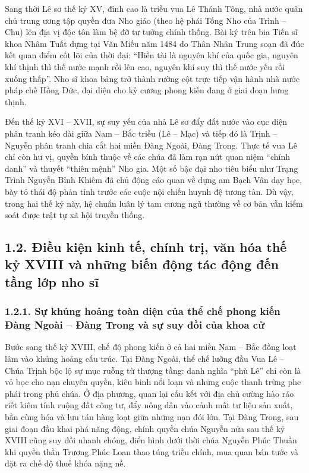 Sang thời Lê sơ thế kỷ XV, đỉnh cao là triều vua Lê Thánh Tông, nhà nước quân chủ trung ương tập quyền đưa Nho giáo (theo hệ phái Tống Nho của Trình -- Chu) lên địa vị độc tôn làm bệ đỡ tư tưởng chính thống. Bài ký trên bia Tiến sĩ khoa Nhâm Tuất dựng tại Văn Miếu năm 1484 do Thân Nhân Trung soạn đã đúc kết quan điểm cốt lõi của thời đại: ``Hiền tài là nguyên khí của quốc gia, nguyên khí thịnh thì thế nước mạnh rồi lên cao, nguyên khí suy thì thế nước yếu rồi xuống thấp''. Nho sĩ khoa bảng trở thành rường cột trực tiếp vận hành nhà nước pháp chế Hồng Đức, đại diện cho kỷ cương phong kiến đang ở giai đoạn hưng thịnh.

Đến thế kỷ XVI -- XVII, sự suy yếu của nhà Lê sơ đẩy đất nước vào cục diện phân tranh kéo dài giữa Nam -- Bắc triều (Lê -- Mạc) và tiếp đó là Trịnh -- Nguyễn phân tranh chia cắt hai miền Đàng Ngoài, Đàng Trong. Thực tế vua Lê chỉ còn hư vị, quyền bính thuộc về các chúa đã làm rạn nứt quan niệm ``chính danh'' và thuyết ``thiên mệnh'' Nho gia. Một số bậc đại nho tiêu biểu như Trạng Trình Nguyễn Bỉnh Khiêm đã chủ động cáo quan về dựng am Bạch Vân dạy học, bày tỏ thái độ phản tỉnh trước các cuộc nội chiến huynh đệ tương tàn. Dù vậy, trong hai thế kỷ này, hệ chuẩn luân lý tam cương ngũ thường về cơ bản vẫn kiểm soát được trật tự xã hội truyền thống.

\subsection*{1.2. Điều kiện kinh tế, chính trị, văn hóa thế kỷ XVIII và những biến động tác động đến tầng lớp nho sĩ}

\subsubsection*{1.2.1. Sự khủng hoảng toàn diện của thể chế phong kiến Đàng Ngoài -- Đàng Trong và sự suy đồi của khoa cử}

Bước sang thế kỷ XVIII, chế độ phong kiến ở cả hai miền Nam -- Bắc đồng loạt lâm vào khủng hoảng cấu trúc. Tại Đàng Ngoài, thể chế lưỡng đầu Vua Lê -- Chúa Trịnh bộc lộ sự mục ruỗng từ thượng tầng: danh nghĩa ``phù Lê'' chỉ còn là vỏ bọc cho nạn chuyên quyền, kiêu binh nổi loạn và những cuộc thanh trừng phe phái trong phủ chúa. Ở địa phương, quan lại cấu kết với địa chủ cường hào ráo riết kiêm tính ruộng đất công tư, đẩy nông dân vào cảnh mất tư liệu sản xuất, bần cùng hóa và lưu tán hàng loạt giữa những nạn đói lớn. Tại Đàng Trong, sau giai đoạn đầu khai phá năng động, chính quyền chúa Nguyễn nửa sau thế kỷ XVIII cũng suy đồi nhanh chóng, điển hình dưới thời chúa Nguyễn Phúc Thuần khi quyền thần Trương Phúc Loan thao túng triều chính, mua quan bán tước và đặt ra chế độ thuế khóa nặng nề.

